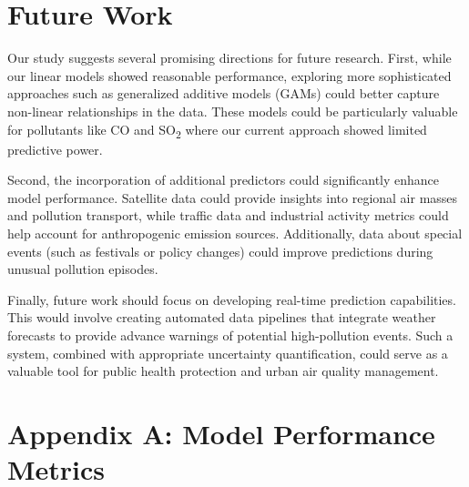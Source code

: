 \documentclass[twoside,11pt]{article}
\begin{document}
\section{Future Work}

Our study suggests several promising directions for future research. First, while our linear models showed reasonable performance, exploring more sophisticated approaches such as generalized additive models (GAMs) could better capture non-linear relationships in the data. These models could be particularly valuable for pollutants like CO and SO\textsubscript{2} where our current approach showed limited predictive power.

Second, the incorporation of additional predictors could significantly enhance model performance. Satellite data could provide insights into regional air masses and pollution transport, while traffic data and industrial activity metrics could help account for anthropogenic emission sources. Additionally, data about special events (such as festivals or policy changes) could improve predictions during unusual pollution episodes.

Finally, future work should focus on developing real-time prediction capabilities. This would involve creating automated data pipelines that integrate weather forecasts to provide advance warnings of potential high-pollution events. Such a system, combined with appropriate uncertainty quantification, could serve as a valuable tool for public health protection and urban air quality management.

\newpage

\section*{Appendix A: Model Performance Metrics}
\end{document}
